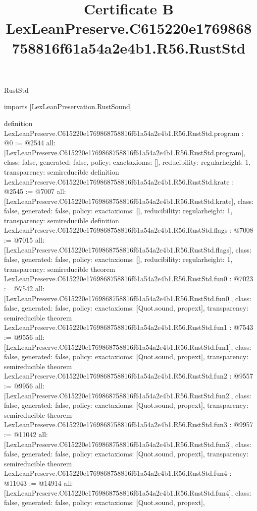 \begin{lexlean}{RustStd}
\title{Certificate B LexLeanPreserve.C615220e1769868758816f61a54a2e4b1.R56.RustStd}
\begin{coremodule}
imports [LexLeanPreservation.RustSound]

definition LexLeanPreserve.C615220e1769868758816f61a54a2e4b1.R56.RustStd.program : @0 := @2544 {
  all: [LexLeanPreserve.C615220e1769868758816f61a54a2e4b1.R56.RustStd.program],
  class: false,
  generated: false,
  policy: exact{axioms: []},
  reducibility: regular{height: 1},
  transparency: semireducible
}
definition LexLeanPreserve.C615220e1769868758816f61a54a2e4b1.R56.RustStd.krate : @2545 := @7007 {
  all: [LexLeanPreserve.C615220e1769868758816f61a54a2e4b1.R56.RustStd.krate],
  class: false,
  generated: false,
  policy: exact{axioms: []},
  reducibility: regular{height: 1},
  transparency: semireducible
}
definition LexLeanPreserve.C615220e1769868758816f61a54a2e4b1.R56.RustStd.flags : @7008 := @7015 {
  all: [LexLeanPreserve.C615220e1769868758816f61a54a2e4b1.R56.RustStd.flags],
  class: false,
  generated: false,
  policy: exact{axioms: []},
  reducibility: regular{height: 1},
  transparency: semireducible
}
theorem LexLeanPreserve.C615220e1769868758816f61a54a2e4b1.R56.RustStd.fun0 : @7023 := @7542 {
  all: [LexLeanPreserve.C615220e1769868758816f61a54a2e4b1.R56.RustStd.fun0],
  class: false,
  generated: false,
  policy: exact{axioms: [Quot.sound, propext]},
  transparency: semireducible
}
theorem LexLeanPreserve.C615220e1769868758816f61a54a2e4b1.R56.RustStd.fun1 : @7543 := @9556 {
  all: [LexLeanPreserve.C615220e1769868758816f61a54a2e4b1.R56.RustStd.fun1],
  class: false,
  generated: false,
  policy: exact{axioms: [Quot.sound, propext]},
  transparency: semireducible
}
theorem LexLeanPreserve.C615220e1769868758816f61a54a2e4b1.R56.RustStd.fun2 : @9557 := @9956 {
  all: [LexLeanPreserve.C615220e1769868758816f61a54a2e4b1.R56.RustStd.fun2],
  class: false,
  generated: false,
  policy: exact{axioms: [Quot.sound, propext]},
  transparency: semireducible
}
theorem LexLeanPreserve.C615220e1769868758816f61a54a2e4b1.R56.RustStd.fun3 : @9957 := @11042 {
  all: [LexLeanPreserve.C615220e1769868758816f61a54a2e4b1.R56.RustStd.fun3],
  class: false,
  generated: false,
  policy: exact{axioms: [Quot.sound, propext]},
  transparency: semireducible
}
theorem LexLeanPreserve.C615220e1769868758816f61a54a2e4b1.R56.RustStd.fun4 : @11043 := @14914 {
  all: [LexLeanPreserve.C615220e1769868758816f61a54a2e4b1.R56.RustStd.fun4],
  class: false,
  generated: false,
  policy: exact{axioms: [Quot.sound, propext]},
}
\end{coremodule}
\end{lexlean}
